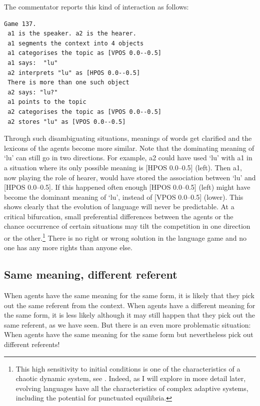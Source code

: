 The commentator reports this kind of interaction as follows: 
\begin{verbatim}
Game 137.
 a1 is the speaker. a2 is the hearer. 
 a1 segments the context into 4 objects
 a1 categorises the topic as [VPOS 0.0--0.5]
 a1 says:  "lu"
 a2 interprets "lu" as [HPOS 0.0--0.5]
 There is more than one such object
 a2 says: "lu?"
 a1 points to the topic
 a2 categorises the topic as [VPOS 0.0--0.5]
 a2 stores "lu" as [VPOS 0.0--0.5]
\end{verbatim}

Through such disambiguating situations, meanings of words
get clarified and the lexicons of the agents
become more similar. Note that the 
dominating meaning of `lu' can still go in 
two directions. For example, {\bfshape a2}
could have used `lu' with {\bfshape a1} 
in a situation where its only possible meaning 
is [HPOS 0.0--0.5] (left). Then {\bfshape a1}, now playing the role
of hearer, would have stored the association between
`lu' and [HPOS 0.0--0.5]. If this happened often 
enough [HPOS 0.0--0.5] (left) might
have become the dominant meaning of `lu', instead of 
[VPOS 0.0--0.5] (lower). This shows clearly that the 
evolution of language will never be predictable. At a critical 
bifurcation, small preferential differences between 
the agents or the chance occurrence of certain situations
may tilt the competition in one direction or the other.\footnote{
This high sensitivity to initial conditions is 
one of the characteristics of a chaotic dynamic
system, see \cite{Lorenz:1993}.
Indeed, as I will explore in more detail later, 
evolving languages have all the characteristics
of complex adaptive systems, including the 
potential for punctuated equilibria.}
There is no right
or wrong solution in the language game and no one has
any more rights than anyone else. 

\subsection{Same meaning, different referent} 

When agents have the same meaning for the same
form, it is likely that they
pick out the same referent from the context. When agents
have a different meaning for the same form, it is less 
likely although it may still happen that they pick 
out the same referent, as we have seen. But there 
is an even more problematic situation: When agents have the 
same meaning for the same form but nevertheless pick out 
different referents! 

